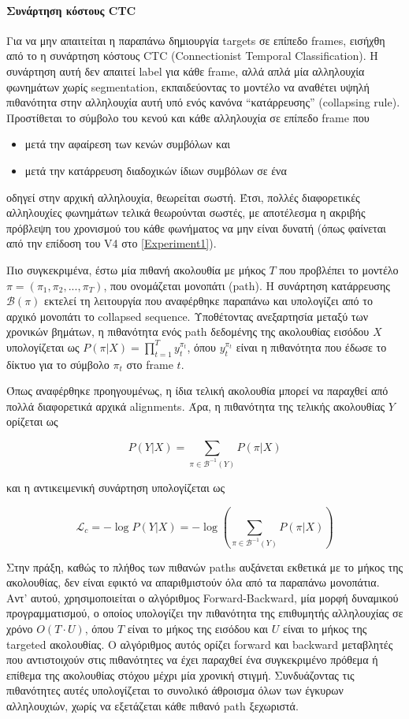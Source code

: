 \paragraph{Συνάρτηση κόστους CTC}

Για να μην απαιτείται η παραπάνω δημιουργία targets σε επίπεδο frames, εισήχθη από το \cite{inproceedings} η συνάρτηση κόστους CTC (Connectionist Temporal Classification). Η συνάρτηση αυτή δεν απαιτεί label για κάθε frame, αλλά απλά μία αλληλουχία φωνημάτων χωρίς segmentation, εκπαιδεύοντας το μοντέλο να αναθέτει υψηλή πιθανότητα στην αλληλουχία αυτή υπό ενός κανόνα ``κατάρρευσης'' (collapsing rule). Προστίθεται το σύμβολο του κενού και κάθε αλληλουχία σε επίπεδο frame που

\begin{itemize}
\item μετά την αφαίρεση των κενών συμβόλων και
\item μετά την κατάρρευση διαδοχικών ίδιων συμβόλων σε ένα
\end{itemize}
οδηγεί στην αρχική αλληλουχία, θεωρείται σωστή. Έτσι, πολλές διαφορετικές αλληλουχίες φωνημάτων τελικά θεωρούνται σωστές, με αποτέλεσμα η ακριβής πρόβλεψη του χρονισμού του κάθε φωνήματος να μην είναι δυνατή (όπως φαίνεται από την επίδοση του V4 στο \ref{Experiment1}).

Πιο συγκεκριμένα, έστω μία πιθανή ακολουθία με μήκος $T$ που προβλέπει το μοντέλο $\pi = (\pi_1, \pi_2, ..., \pi_T)$, που ονομάζεται μονοπάτι (path). Η συνάρτηση κατάρρευσης $\mathcal{B}(\pi)$ εκτελεί τη λειτουργία που αναφέρθηκε παραπάνω και υπολογίζει από το αρχικό μονοπάτι το collapsed sequence. Υποθέτοντας ανεξαρτησία μεταξύ των χρονικών βημάτων, η πιθανότητα ενός path δεδομένης της ακολουθίας εισόδου $X$ υπολογίζεται ως $P(\pi|X) = \prod_{t=1}^{T} y_{t}^{\pi_t}$, όπου $y_{t}^{\pi_t}$ είναι η πιθανότητα που έδωσε το δίκτυο για το σύμβολο $\pi_t$ στο frame $t$. 

Όπως αναφέρθηκε προηγουμένως, η ίδια τελική ακολουθία μπορεί να παραχθεί από πολλά διαφορετικά αρχικά alignments. Άρα, η πιθανότητα της τελικής ακολουθίας $Y$ ορίζεται ως

\[
P(Y|X) = \sum_{\pi \in \mathcal{B}^{-1}(Y)} P(\pi|X)
\]

και η αντικειμενική συνάρτηση υπολογίζεται ως 

\[
\mathcal{L}_c = -\log P(Y|X) = -\log \left(\sum_{\pi \in \mathcal{B}^{-1}(Y)} P(\pi|X)\right)
\]

Στην πράξη, καθώς το πλήθος των πιθανών paths αυξάνεται εκθετικά με το μήκος της ακολουθίας, δεν είναι εφικτό να απαριθμιστούν όλα από τα παραπάνω μονοπάτια. Αντ' αυτού, χρησιμοποιείται ο αλγόριθμος Forward-Backward, μία μορφή δυναμικού προγραμματισμού, ο οποίος υπολογίζει την πιθανότητα της επιθυμητής αλληλουχίας σε χρόνο $O(T \cdot U)$, όπου $T$ είναι το μήκος της εισόδου και $U$ είναι το μήκος της targeted ακολουθίας. Ο αλγόριθμος αυτός ορίζει forward και backward μεταβλητές που αντιστοιχούν στις πιθανότητες να έχει παραχθεί ένα συγκεκριμένο πρόθεμα ή επίθεμα της ακολουθίας στόχου μέχρι μία χρονική στιγμή. Συνδυάζοντας τις πιθανότητες αυτές υπολογίζεται το συνολικό άθροισμα όλων των έγκυρων αλληλουχιών, χωρίς να εξετάζεται κάθε πιθανό path ξεχωριστά.

